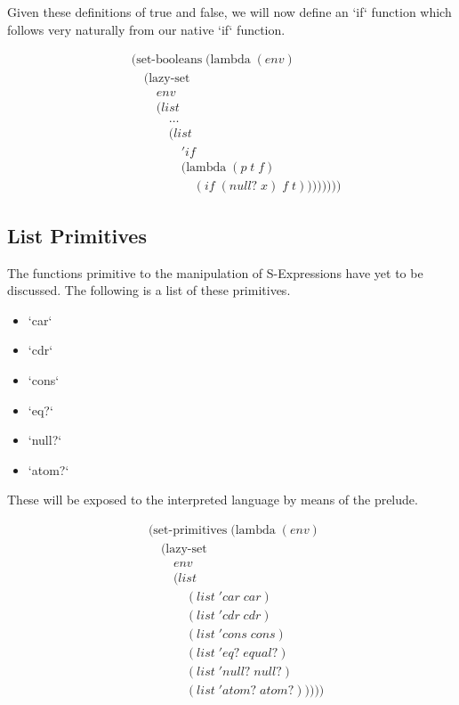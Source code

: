 Given these definitions of true and false, we will now define an `if` 
function which follows very naturally from our native `if` function.

\begin{align*}
& (\text{set-booleans} \; (\text{lambda} \; (env) \; 
\\& \quad (\text{lazy-set} \; 
\\& \qquad env
\\& \qquad (list \; 
\\& \qquad \quad \dots
\\& \qquad \quad (list
\\& \qquad \qquad 'if \; 
\\& \qquad \qquad (\text{lambda} \; (p \; t \; f)
\\& \qquad \qquad \quad (if \; (null? \; x) \; f \; t))))))))
\end{align*}

\subsection{List Primitives}
The functions primitive to the manipulation of S-Expressions have yet to be 
discussed. The following is a list of these primitives.

\begin{itemize}
  \item `car`
  \item `cdr`
  \item `cons`
  \item `eq?`
  \item `null?`
  \item `atom?`
\end{itemize}

These will be exposed to the interpreted language by means of the prelude.

\begin{align*}
& (\text{set-primitives} \; (\text{lambda} \; (env)
\\& \quad (\text{lazy-set}
\\& \qquad env
\\& \qquad (list
\\& \qquad \quad (list \; 'car \; car)
\\& \qquad \quad (list \; 'cdr \; cdr)
\\& \qquad \quad (list \; 'cons \; cons)
\\& \qquad \quad (list \; 'eq? \; equal?)
\\& \qquad \quad (list \; 'null? \; null?)
\\& \qquad \quad (list \; 'atom? \; atom?)))))
\end{align*}

